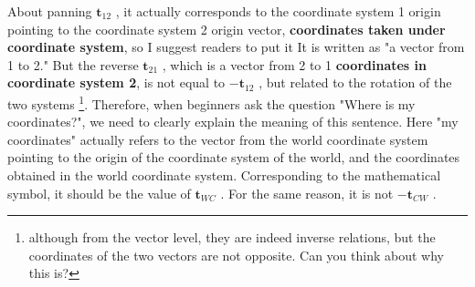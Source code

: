 About panning $ \bm {t}_{12} $ , it actually corresponds to the coordinate system 1 origin pointing to the coordinate system 2 origin vector, \textbf{ coordinates taken under coordinate system}, so I suggest readers to put it It is written as "a vector from 1 to 2." But the reverse $ \bm {t}_{21} $ , which is a vector from 2 to 1 \textbf{coordinates in coordinate system 2}, is not equal to $ - \bm{t}_{12} $ , but related to the rotation of the two systems \footnote{although from the vector level, they are indeed inverse relations, but the coordinates of the two vectors are not opposite. Can you think about why this is? }. Therefore, when beginners ask the question "Where is my coordinates?", we need to clearly explain the meaning of this sentence. Here "my coordinates" actually refers to the vector from the world coordinate system pointing to the origin of the coordinate system of the world, and the coordinates obtained in the world coordinate system. Corresponding to the mathematical symbol, it should be the value of $ \bm{t}_{WC} $ . For the same reason, it is not $ - \bm {t}_{CW} $ .
